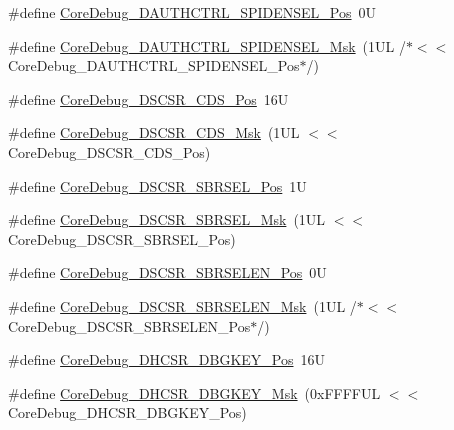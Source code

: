 \begin{DoxyCompactItemize}
\item 
\#define \mbox{\hyperlink{group___c_m_s_i_s___core_debug_ga587610b7ac18292de47bf9d675b0b88c}{Core\+Debug\+\_\+\+D\+A\+U\+T\+H\+C\+T\+R\+L\+\_\+\+S\+P\+I\+D\+E\+N\+S\+E\+L\+\_\+\+Pos}}~0U
\item 
\#define \mbox{\hyperlink{group___c_m_s_i_s___core_debug_gaa043fd13768d57be320c682ca1c9b234}{Core\+Debug\+\_\+\+D\+A\+U\+T\+H\+C\+T\+R\+L\+\_\+\+S\+P\+I\+D\+E\+N\+S\+E\+L\+\_\+\+Msk}}~(1\+U\+L /$\ast$$<$$<$ Core\+Debug\+\_\+\+D\+A\+U\+T\+H\+C\+T\+R\+L\+\_\+\+S\+P\+I\+D\+E\+N\+S\+E\+L\+\_\+\+Pos$\ast$/)
\item 
\#define \mbox{\hyperlink{group___c_m_s_i_s___core_debug_ga4be5d0f8af5d7d8ec04bde78ce18e10e}{Core\+Debug\+\_\+\+D\+S\+C\+S\+R\+\_\+\+C\+D\+S\+\_\+\+Pos}}~16U
\item 
\#define \mbox{\hyperlink{group___c_m_s_i_s___core_debug_ga083417245e1aa40e84a2b12433a15a6b}{Core\+Debug\+\_\+\+D\+S\+C\+S\+R\+\_\+\+C\+D\+S\+\_\+\+Msk}}~(1\+U\+L $<$$<$ Core\+Debug\+\_\+\+D\+S\+C\+S\+R\+\_\+\+C\+D\+S\+\_\+\+Pos)
\item 
\#define \mbox{\hyperlink{group___c_m_s_i_s___core_debug_ga7450603163415ab4d4e4a7a767879eae}{Core\+Debug\+\_\+\+D\+S\+C\+S\+R\+\_\+\+S\+B\+R\+S\+E\+L\+\_\+\+Pos}}~1U
\item 
\#define \mbox{\hyperlink{group___c_m_s_i_s___core_debug_gaaffe28a24f05446e55ba3d75bb6f4cd0}{Core\+Debug\+\_\+\+D\+S\+C\+S\+R\+\_\+\+S\+B\+R\+S\+E\+L\+\_\+\+Msk}}~(1\+U\+L $<$$<$ Core\+Debug\+\_\+\+D\+S\+C\+S\+R\+\_\+\+S\+B\+R\+S\+E\+L\+\_\+\+Pos)
\item 
\#define \mbox{\hyperlink{group___c_m_s_i_s___core_debug_ga3eb88e444b678057db1b59272eebb1ad}{Core\+Debug\+\_\+\+D\+S\+C\+S\+R\+\_\+\+S\+B\+R\+S\+E\+L\+E\+N\+\_\+\+Pos}}~0U
\item 
\#define \mbox{\hyperlink{group___c_m_s_i_s___core_debug_ga5e5ed94cac1139165af161c008881805}{Core\+Debug\+\_\+\+D\+S\+C\+S\+R\+\_\+\+S\+B\+R\+S\+E\+L\+E\+N\+\_\+\+Msk}}~(1\+U\+L /$\ast$$<$$<$ Core\+Debug\+\_\+\+D\+S\+C\+S\+R\+\_\+\+S\+B\+R\+S\+E\+L\+E\+N\+\_\+\+Pos$\ast$/)
\item 
\#define \mbox{\hyperlink{group___c_m_s_i_s___core_debug_gac91280edd0ce932665cf75a23d11d842}{Core\+Debug\+\_\+\+D\+H\+C\+S\+R\+\_\+\+D\+B\+G\+K\+E\+Y\+\_\+\+Pos}}~16U
\item 
\#define \mbox{\hyperlink{group___c_m_s_i_s___core_debug_ga1ce997cee15edaafe4aed77751816ffc}{Core\+Debug\+\_\+\+D\+H\+C\+S\+R\+\_\+\+D\+B\+G\+K\+E\+Y\+\_\+\+Msk}}~(0x\+F\+F\+F\+F\+U\+L $<$$<$ Core\+Debug\+\_\+\+D\+H\+C\+S\+R\+\_\+\+D\+B\+G\+K\+E\+Y\+\_\+\+Pos)
$$
\end{DoxyCompactItemize}
